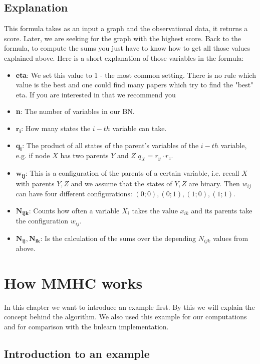 	\section*{Explanation}

		This formula takes as an input a graph and the observational data, it returns a score. Later, we are seeking for the graph with the highest score. Back to the formula, to compute the sums you just have to know how to get all those values explained above. Here is a short explanation of those variables in the formula:

		\begin{itemize}
			\item \textbf{eta}: We set this value to 1 - the most common setting. There is no rule which value is the best and one could find many papers which try to find the "best" eta. If you are interested in that we recommend you \cite{SKM}
			\item \textbf{n}: The number of variables in our BN.
			\item $\boldsymbol{r_{i}}$: How many states the $i-th$ variable can take.
			\item $\boldsymbol{q_{i}}$: The product of all states of the parent's variables of the $i-th$ variable, e.g. if node $X$ has two parents $Y$ and $Z$ $q_{X} = r_{y} \cdot r_{z}$.
			\item $\boldsymbol{w_{ij}}$: This is a configuration of the parents of a certain variable, i.e. recall $X$ with parents $Y, Z$ and we assume that the states of $Y, Z$ are binary. Then $w_{ij}$ can have four different configurations: $(0; 0), (0; 1), (1; 0), (1; 1)$.
			\item $\boldsymbol{N_{ijk}}$: Counts how often a variable $X_{i}$ takes the value $x_{ik}$ and its parents take the configuration $w_{ij}$.
			\item $\boldsymbol{N_{ij}, N_{ik}}$: Is the calculation of the sums over the depending $N_{ijk}$ values from above.
		\end{itemize}

\chapter{How MMHC works}

	In this chapter we want to introduce an example first. By this we will explain the concept behind the algorithm. We also used this example for our computations and for comparison with the bnlearn implementation.

	\section{Introduction to an example}

